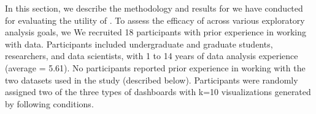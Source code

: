 In this section, we describe the methodology and results for  we have conducted for evaluating the utility of \system. To assess the efficacy of \system across various exploratory analysis goals, we 
We recruited 18 participants  with prior experience in working with data. Participants included undergraduate and graduate students, researchers, and data scientists, with 1 to 14 years of data analysis experience (average = 5.61).  No participants reported prior experience in working with the two datasets used in the study (described below). Participants were randomly assigned two of the three types of dashboards with k=10 visualizations generated by following conditions. 

